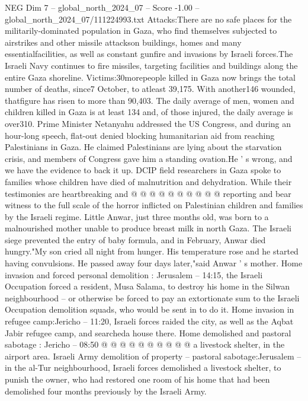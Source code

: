 \begin{textsample}{NEG Dim 7 – global\_north\_2024\_07 – Score -1.00 – global\_north\_2024\_07/111224993.txt}  \label{ex:f7_neg_410}
Attacks:There are no safe places for the militarily-dominated population in Gaza, who find themselves subjected to airstrikes and other missile attackson buildings, homes and many essentialfacilities, as well as constant gunfire and invasions by Israeli forces.The Israeli Navy continues to fire missiles, targeting facilities and buildings along the entire Gaza shoreline.
Victims:30morepeople killed in Gaza now brings the total number of deaths, since7 October, to atleast 39,175.
With another146 wounded, thatfigure has risen to more than 90,403.
The daily average of men, women and children killed in Gaza is at least 134 and, of those injured, the daily average is over310.
Prime Minister Netanyahu addressed the US Congress, and during an hour-long speech, flat-out denied blocking humanitarian aid from reaching Palestinians in Gaza.
He claimed Palestinians are lying about the starvation crisis, and members of Congress gave him a standing ovation.He ' s wrong, and we have the evidence to back it up.
DCIP field researchers in Gaza spoke to families whose children have died of malnutrition and dehydration.
While their testimonies are heartbreaking and @ @ @ @ @ @ @ @ @ @ reporting and bear witness to the full scale of the horror inflicted on Palestinian children and families by the Israeli regime.
Little Anwar, just three months old, was born to a malnourished mother unable to produce breast milk in north Gaza.
The Israeli siege prevented the entry of baby formula, and in February, Anwar died hungry."My son cried all night from hunger.
His temperature rose and he started having convulsions.
He passed away four days later,"said Anwar ' s mother.
Home invasion and forced personal demolition : Jerusalem -- 14:15, the Israeli Occupation forced a resident, Musa Salama, to destroy his home in the Silwan neighbourhood -- or otherwise be forced to pay an extortionate sum to the Israeli Occupation demolition squads, who would be sent in to do it.
Home invasion in refugee camp:Jericho -- 11:20, Israeli forces raided the city, as well as the Aqbat Jabir refugee camp, and searcheda house there.
Home demolished and pastoral sabotage : Jericho -- 08:50 @ @ @ @ @ @ @ @ @ @ a livestock shelter, in the airport area.
Israeli Army demolition of property -- pastoral sabotage:Jerusalem -- in the al-Tur neighbourhood, Israeli forces demolished a livestock shelter, to punish the owner, who had restored one room of his home that had been demolished four months previously by the Israeli Army.

\end{textsample}
